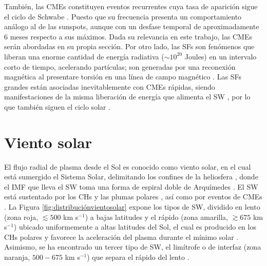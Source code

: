 También, las \acp{CME} constituyen eventos recurrentes cuya tasa de aparición sigue el ciclo de Schwabe \parencite[e.g.,][]{lamy-2019, webb-1991, webb-1994, robbrecht-2009}. Puesto que su frecuencia presenta un comportamiento análogo al de las sunspots, aunque con un desfase temporal de aproximadamente 6 meses respecto a sus máximos. Dada su relevancia en este trabajo, las CMEs serán abordadas en su propia sección. Por otro lado, las \acp{SF} son fenómenos que liberan una enorme cantidad de energía radiativa ($\sim 10^{20}$ Joules) en un intervalo corto de tiempo, acelerando partículas; son generadas por una reconexión magnética al presentare torsión en una línea de campo magnético \parencite[e.g.,][]{SolarFlares}. Las \acp{SF} grandes están asociadas inevitablemente con \acp{CME} rápidas, siendo manifestaciones de la misma liberación de energía que alimenta el \ac{SW} \parencite[e.g.,][]{low1994coronal, zhang-2001, kahler-1992,  feynman-1994, gosling-1976}, por lo que también siguen el ciclo solar \parencite[e.g.,][]{kossobokov-2011}.

\section{Viento solar}

El flujo radial de plasma desde el Sol es conocido como viento solar, en el cual está sumergido el Sistema Solar, delimitando los confines de la heliosfera \parencite[e.g.,][]{stone-2013}, donde el \ac{IMF} que lleva el \ac{SW} toma una forma de espiral doble de Arquímedes \parencite[e.g.,][]{parker-1958, lugaz-2005}. El \ac{SW} está sustentado por los \acp{CH} y las plumas polares \parencite[e.g.,][]{schwenn-2007, cranmer-2009, cranmer-2019, parker-1958}, así como por eventos de \acp{CME} \parencite[e.g.,][]{emslie-2012}. La Figura \ref{fig:distribuciónvientosolar} expone los tipos de \ac{SW}, dividido en lento (zona roja, $\lesssim 500$ km s$^{-1}$) a bajas latitudes y el rápido (zona amarilla, $\gtrsim675$ km s$^{-1}$) ubicado uniformemente a altas latitudes del Sol, el cual es producido en los \acp{CH} polares y favorece la aceleración del plasma durante el mínimo solar \parencite[e.g.,][]{cranmer-2009, stakhiv-2015, antonucci-2000}. Asimismo, se ha encontrado un tercer tipo de \ac{SW}, el limítrofe o de interfaz (zona naranja, $500-675$ km s$^{-1}$) que separa el rápido del lento \parencite[e.g.,][]{stakhiv-2015}. 

